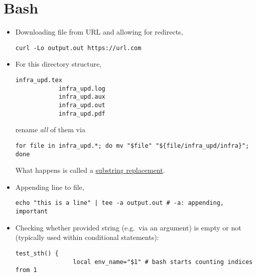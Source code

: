 \documentclass[12pt, a4paper]{article}
\numberwithin{equation}{section}
\theoremstyle{definition}
\theoremstyle{definition}
\begin{document}
	\newpage 
	
	\section{Bash}
	
	\begin{itemize}
		\item Downloading file from URL and allowing for redirects, 
		
		\begin{lstlisting}[style=mystylebash, label=alg:curl, xleftmargin=\parindent]
			curl -Lo output.out https://url.com
		\end{lstlisting}
	
		\item For this directory structure, 
		
		\begin{lstlisting}[style=mystylebash, label=alg:exmp__dir_struc, xleftmargin=\parindent]
			infra_upd.tex
			infra_upd.log
			infra_upd.aux
			infra_upd.out
			infra_upd.pdf
		\end{lstlisting} 
		
		rename \textit{all} of them via
		
		\begin{lstlisting}[style=mystylebash, label=alg:linux_mv_files_for, xleftmargin=\parindent]
			for file in infra_upd.*; do mv "$file" "${file/infra_upd/infra}"; done
		\end{lstlisting}
		
		What happens is called a 	\href{https://stackoverflow.com/questions/13210880/replace-one-substring-for-another-string-in-shell-script}{\color{blue}substring replacement}. 
		
		\item Appending line to file,
		
		\begin{lstlisting}[style=mystylebash, label=alg:ubuntu__line_appending, xleftmargin=\parindent]
			echo "this is a line" | tee -a output.out # -a: appending, important
		\end{lstlisting}
		
		\item Checking whether provided string (e.g.~via an argument) is empty or not (typically used within conditional statements): 
		
		\begin{lstlisting}[style=mystylebash, label=alg:bash__empty_string_check, caption=Check (e.g.~in if-clause) whether string is empty or not, xleftmargin=\parindent]
			test_sth() {
				local env_name="$1" # bash starts counting indices from 1
				

\end{lstlisting}
\end{itemize}
\end{document}
